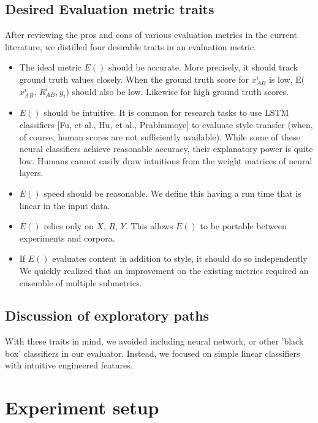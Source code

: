 \documentclass[letterpaper, 10 pt, conference]{ieeeconf}  %
\begin{document}
  \subsection{Desired Evaluation metric traits}
      After reviewing the pros and cons of various evaluation metrics in the current literature, we distilled four desirable traits in an evaluation metric.
    \begin{itemize}

      \item The ideal metric $E()$ should be accurate. More precisely, it should track ground truth values closely. When the ground truth score for $x_{AB}^i$ is low, E($x_{AB}^i$, $R_{AB}^i, y_i$) should also be low. Likewise for high ground truth scores.
      \item $E()$ should be intuitive. It is common for research tasks to use LSTM classifiers [Fu, et al., Hu, et al., Prabhumoye] to evaluate style transfer (when, of course, human scores are not sufficiently available). While some of these neural classifiers achieve reasonable accuracy, their explanatory power is quite low. Humans cannot easily draw intuitions from the weight matrices of neural layers.
      \item $E()$ speed should be reasonable. We define this having a run time that is linear in the input data.
      \item $E()$ relies only on $X$, $R$, $Y$. This allows $E()$ to be portable between experiments and corpora.
      \item If $E()$ evaluates content in addition to style, it should do so independently
      We quickly realized that an improvement on the existing metrics required an ensemble of multiple submetrics.
    \end{itemize}
  \subsection{Discussion of exploratory paths} 
  With these traits in mind, we avoided including neural network, or other 'black box' classifiers in our evaluator. Instead, we focused on simple linear classifiers with intuitive engineered features. 


\section{Experiment setup}
  
\end{document}
